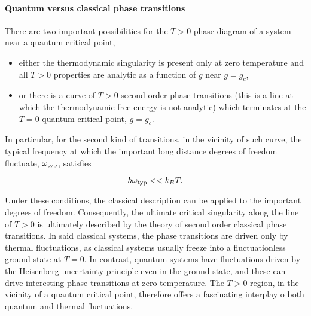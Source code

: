 \paragraph{\textbf{Quantum versus classical phase transitions}}

There are two important possibilities for the $T > 0$ phase diagram of a system near a quantum critical point, 
\begin{itemize}
    \item either the thermodynamic singularity is present only at zero temperature and all $T>0$ properties are analytic as a function of $g$ near $g = g_c$,
    \item or there is a curve of $T>0$ second order phase transitions (this is a line at which the thermodynamic free energy is not analytic) which terminates at the $T=0$-quantum critical point, $g = g_c$.
\end{itemize}

In particular, for the second kind of transitions, in the vicinity of such curve, the typical frequency at which the important long distance degrees of freedom fluctuate, $\omega_{\textnormal{typ}}$, satisfies 

$$
\hbar \omega_{\textnormal{typ}} << k_B T.
$$

Under these conditions, the classical description can be applied to the important degrees of freedom. Consequently, the ultimate critical singularity along the line of $T>0$ is ultimately described by the theory of second order classical phase transitions. In said classical systems, the phase transitions are driven only by thermal fluctuations, as classical systems usually freeze into a fluctuationless ground state at $T=0$. In contrast, quantum systems have fluctuations driven by the Heisenberg uncertainty principle even in the ground state, and these can drive interesting phase transitions at zero temperature. The $T>0$ region, in the vicinity of a quantum critical point, therefore offers a fascinating interplay o both quantum and thermal fluctuations. 
